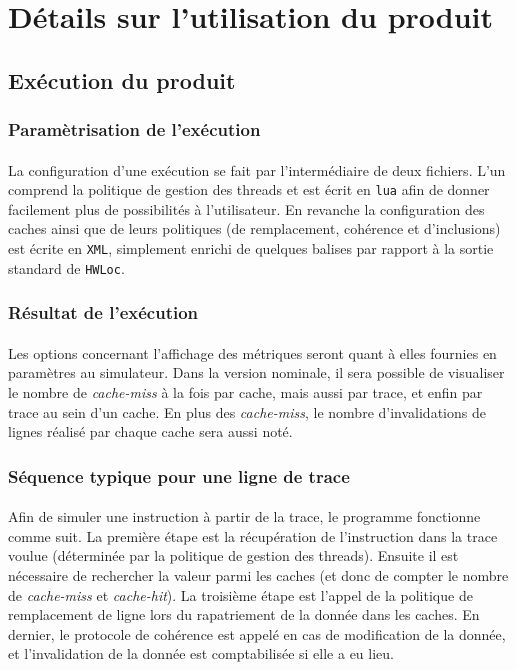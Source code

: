 \section{Détails sur l'utilisation du produit}


\subsection{Exécution du produit}

\subsubsection{Paramètrisation de l'exécution}
\paragraph{}
La configuration d'une exécution se fait par l'intermédiaire de deux fichiers. L'un comprend la politique de gestion des threads et est écrit en \texttt{lua} afin de donner facilement plus de possibilités à l'utilisateur. En revanche la configuration des caches ainsi que de leurs politiques (de remplacement, cohérence et d'inclusions) est écrite en \texttt{XML}, simplement enrichi de quelques balises par rapport à la sortie standard de \texttt{HWLoc}.

\subsubsection{Résultat de l'exécution}
\paragraph{}
Les options concernant l'affichage des métriques seront quant à elles fournies en paramètres au simulateur. Dans la version nominale, il sera possible de visualiser le nombre de \emph{cache-miss} à la fois par cache, mais aussi par trace, et enfin par trace au sein d'un cache. En plus des \emph{cache-miss}, le nombre d'invalidations de lignes réalisé par chaque cache sera aussi noté.

\subsubsection{Séquence typique pour une ligne de trace}
\paragraph{}
Afin de simuler une instruction à partir de la trace, le programme fonctionne comme suit. La première étape est la récupération de l'instruction dans la trace voulue (déterminée par la politique de gestion des threads). Ensuite il est nécessaire de rechercher la valeur parmi les caches (et donc de compter le nombre de \emph{cache-miss} et \emph{cache-hit}). La troisième étape est l'appel de la politique de remplacement de ligne lors du rapatriement de la donnée dans les caches. En dernier, le protocole de cohérence est appelé en cas de modification de la donnée, et l'invalidation de la donnée est comptabilisée si elle a eu lieu.

